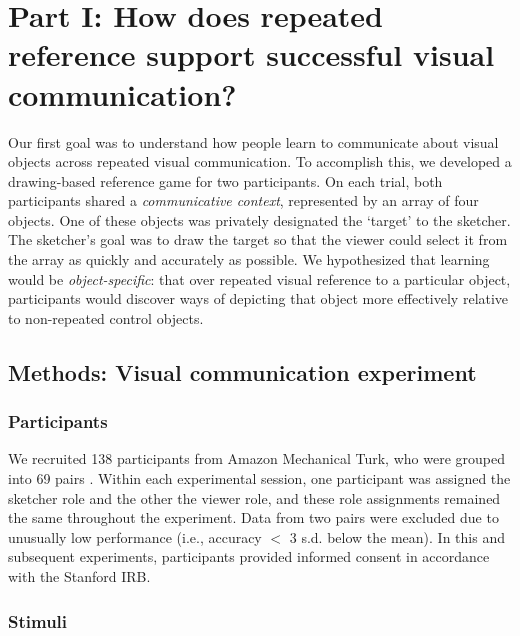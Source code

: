 \documentclass[10pt,letterpaper]{article}
\begin{document}



\section{Part I: How does repeated reference support successful visual communication?}

Our first goal was to understand how people learn to communicate about visual objects across repeated visual communication.
To accomplish this, we developed a drawing-based reference game for two participants.
On each trial, both participants shared a \textit{communicative context}, represented by an array of four objects.
One of these objects was privately designated the `target' to the sketcher.
The sketcher's goal was to draw the target so that the viewer could select it from the array as quickly and accurately as possible.
We hypothesized that learning would be \emph{object-specific}: that over repeated visual reference to a particular object, participants would discover ways of depicting that object more effectively relative to non-repeated control objects.

\subsection{Methods: Visual communication experiment}

\subsubsection{Participants} We recruited 138 participants from Amazon Mechanical Turk, who were grouped into 69 pairs \cite{Hawkins15_RealTimeWebExperiments}.
Within each experimental session, one participant was assigned the sketcher role and the other the viewer role, and these role assignments remained the same throughout the experiment.
Data from two pairs were excluded due to unusually low performance (i.e., accuracy $<$ 3 s.d. below the mean). In this and subsequent experiments, participants provided informed consent in accordance with the Stanford IRB.

\subsubsection{Stimuli}
\end{document}
